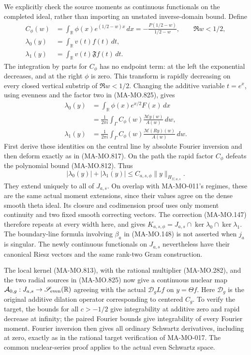 We explicitly check the source moments as continuous
functionals on the completed ideal, rather than importing
an unstated inverse-domain bound. Define
\[
 \begin{aligned}
 C_\phi(w)
   &=\int_{\mathbb R}\phi(x)e^{(1/2-w)x}\,dx
       =-\frac{P(1/2-w)}{1/2-w},\qquad \Re w<1/2,\\
 \lambda_0(y)&=\int_{\mathbb R}v(t)f(t)\,dt,\\
 \lambda_1(y)&=\int_{\mathbb R}v(t)\mathfrak Ff(t)\,dt .
 \end{aligned}
 \tag{MA-MO.826}
\]
The integration by parts for \(C_\phi\) has no endpoint
term: at the left the exponential decreases, and at
the right \(\phi\) is zero. This transform is rapidly
decreasing on every closed vertical substrip of
\(\Re w<1/2\).
Changing the additive variable \(t=e^x\), using
evenness and the factor two in (MA-MO.825), gives
\[
 \begin{aligned}
 \lambda_0(y)
   &=\int_{\mathbb R}\phi(x)e^{x/2}F(x)\,dx\\
   &=\frac1{2\pi i}\int_{\Gamma}
           C_\phi(w)\frac{\mathcal My(w)}{A(w)}\,dw,\\
 \lambda_1(y)
   &=\frac1{2\pi i}\int_{\Gamma}
           C_\phi(w)\frac{\mathcal M(Ry)(w)}{A(w)}\,dw .
 \end{aligned}
 \tag{MA-MO.827}
\]
First derive these identities on the central line by
absolute Fourier inversion and then deform exactly
as in (MA-MO.817). On the path the rapid factor
\(C_\phi\) defeats the polynomial bound (MA-MO.812).
Thus
\[
       |\lambda_0(y)|+|\lambda_1(y)|
                         \le C_{a,s,\phi}\|y\|_{H_{\Sigma,a,s}} .
 \tag{MA-MO.828}
\]
They extend uniquely to all of \(J_{a,s}\).
On overlap with MA-MO-011's regimes, these are the
same actual moment extensions, since their values
agree on the dense smooth theta ideal. Its closure
and codimension proof uses only moment continuity
and two fixed smooth correcting vectors. The
correction (MA-MO.147) therefore repeats at every
width here, and gives
\(K_{a,s,\phi}=J_{a,s}\cap\ker\lambda_0\cap\ker\lambda_1\).
The boundary-line formula involving \(\beta_a\)
in (MA-MO.148) is not asserted when \(j_a\)
is singular. The newly continuous functionals
on \(J_{a,s}\) nevertheless have their canonical
Riesz vectors and the same rank-two Gram construction.

The local kernel (MA-MO.813), with the rational
multiplier (MA-MO.282), and the two radial sources
in (MA-MO.825) now give a continuous nuclear map
\(\mathcal A_{0,g}:J_{a,s}\to\mathscr S_{\rm even}(\mathbb R)\)
agreeing with the actual \(\mathcal D_gLf\) on
\(y=\Theta f\).
Here \(\mathcal D_g\) is the original additive dilation
operator corresponding to centered \(C_g\).
To verify the target, the bounds for all \(c>-1/2\)
give integrability at additive zero and rapid decrease
at infinity; the paired Fourier bounds give integrability
of every Fourier moment. Fourier inversion then gives
all ordinary Schwartz derivatives, including at zero,
exactly as in the rational target verification of
MA-MO-017. The common nuclear-series proof applies to
the actual even Schwartz space.

